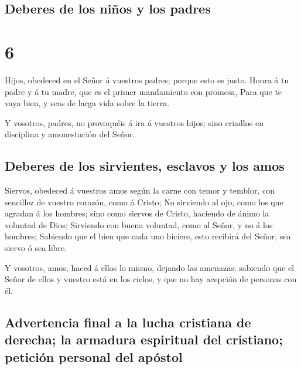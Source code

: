\hypertarget{deberes-de-los-niuxf1os-y-los-padres}{%
\subsection{Deberes de los niños y los
padres}\label{deberes-de-los-niuxf1os-y-los-padres}}

\hypertarget{section-5}{%
\section{6}\label{section-5}}

 Hijos, obedeced en el Señor á vuestros padres; porque esto
es justo.  Honra á tu padre y á tu madre, que es el primer
mandamiento con promesa,  Para que te vaya bien, y seas de
larga vida sobre la tierra.

 Y vosotros, padres, no provoquéis á ira á vuestros hijos;
sino criadlos en disciplina y amonestación del Señor.

\hypertarget{deberes-de-los-sirvientes-esclavos-y-los-amos}{%
\subsection{Deberes de los sirvientes, esclavos y los
amos}\label{deberes-de-los-sirvientes-esclavos-y-los-amos}}

 Siervos, obedeced á vuestros amos según la carne con temor
y temblor, con sencillez de vuestro corazón, como á Cristo; 
No sirviendo al ojo, como los que agradan á los hombres; sino como
siervos de Cristo, haciendo de ánimo la voluntad de Dios; 
Sirviendo con buena voluntad, como al Señor, y no á los hombres;
 Sabiendo que el bien que cada uno hiciere, esto recibirá
del Señor, sea siervo ó sea libre.

 Y vosotros, amos, haced á ellos lo mismo, dejando las
amenazas: sabiendo que el Señor de ellos y vuestro está en los cielos, y
que no hay acepción de personas con él.

\hypertarget{advertencia-final-a-la-lucha-cristiana-de-derecha-la-armadura-espiritual-del-cristiano-peticiuxf3n-personal-del-apuxf3stol}{%
\subsection{Advertencia final a la lucha cristiana de derecha; la
armadura espiritual del cristiano; petición personal del
apóstol}\label{advertencia-final-a-la-lucha-cristiana-de-derecha-la-armadura-espiritual-del-cristiano-peticiuxf3n-personal-del-apuxf3stol}}


